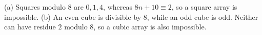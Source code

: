 (a) Squares modulo $8$ are $0,1,4$, whereas $8n+10\equiv2$, so a square array is impossible. (b) An even cube is divisible by $8$, while an odd cube is odd. Neither can have residue $2$ modulo $8$, so a cubic array is also impossible.
